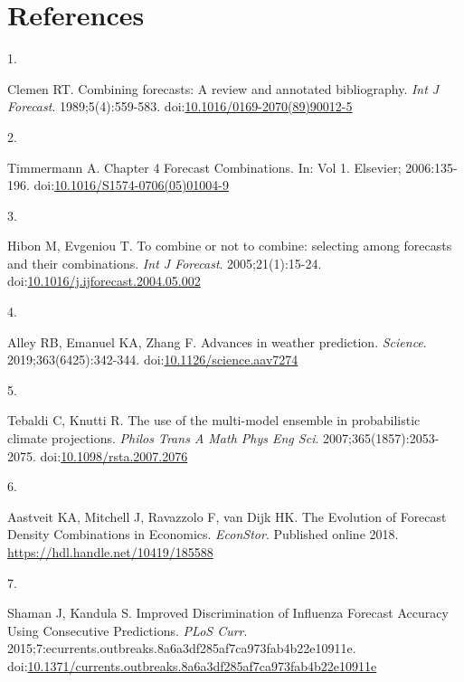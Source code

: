 \documentclass[
]{article}
\newlength{\cslhangindent}
\newlength{\csllabelwidth}
\newenvironment{CSLReferences}[2] %
 {\begin{list}{}{%
  \setlength{\itemindent}{0pt}
  \setlength{\leftmargin}{0pt}
  \setlength{\parsep}{0pt}
  \ifodd #1
   \setlength{\leftmargin}{\cslhangindent}
   \setlength{\itemindent}{-1\cslhangindent}
  \fi
  \setlength{\itemsep}{#2\baselineskip}}}
 {\end{list}}
\newcommand{\CSLLeftMargin}[1]{\parbox[t]{\csllabelwidth}{\strut#1\strut}}
\newcommand{\CSLRightInline}[1]{\parbox[t]{\linewidth - \csllabelwidth}{\strut#1\strut}}
\begin{document}
\section*{References}\label{references}

\label{refs}
\begin{CSLReferences}{0}{1}
\CSLLeftMargin{1. }%
\CSLRightInline{Clemen RT. Combining forecasts: A review and annotated
bibliography. \emph{Int J Forecast}. 1989;5(4):559-583.
doi:\href{https://doi.org/10.1016/0169-2070(89)90012-5}{10.1016/0169-2070(89)90012-5}}

\CSLLeftMargin{2. }%
\CSLRightInline{Timmermann A. Chapter 4 Forecast Combinations. In: Vol
1. Elsevier; 2006:135-196.
doi:\href{https://doi.org/10.1016/S1574-0706(05)01004-9}{10.1016/S1574-0706(05)01004-9}}

\CSLLeftMargin{3. }%
\CSLRightInline{Hibon M, Evgeniou T. To combine or not to combine:
selecting among forecasts and their combinations. \emph{Int J Forecast}.
2005;21(1):15-24.
doi:\href{https://doi.org/10.1016/j.ijforecast.2004.05.002}{10.1016/j.ijforecast.2004.05.002}}

\CSLLeftMargin{4. }%
\CSLRightInline{Alley RB, Emanuel KA, Zhang F. Advances in weather
prediction. \emph{Science}. 2019;363(6425):342-344.
doi:\href{https://doi.org/10.1126/science.aav7274}{10.1126/science.aav7274}}

\CSLLeftMargin{5. }%
\CSLRightInline{Tebaldi C, Knutti R. The use of the multi-model ensemble
in probabilistic climate projections. \emph{Philos Trans A Math Phys Eng
Sci}. 2007;365(1857):2053-2075.
doi:\href{https://doi.org/10.1098/rsta.2007.2076}{10.1098/rsta.2007.2076}}

\CSLLeftMargin{6. }%
\CSLRightInline{Aastveit KA, Mitchell J, Ravazzolo F, van Dijk HK. The
Evolution of Forecast Density Combinations in Economics.
\emph{EconStor}. Published online 2018.
\url{https://hdl.handle.net/10419/185588}}

\CSLLeftMargin{7. }%
\CSLRightInline{Shaman J, Kandula S. Improved {Discrimination} of
{Influenza} {Forecast} {Accuracy} {Using} {Consecutive} {Predictions}.
\emph{PLoS Curr}.
2015;7:ecurrents.outbreaks.8a6a3df285af7ca973fab4b22e10911e.
doi:\href{https://doi.org/10.1371/currents.outbreaks.8a6a3df285af7ca973fab4b22e10911e}{10.1371/currents.outbreaks.8a6a3df285af7ca973fab4b22e10911e}}


\end{CSLReferences}
\end{document}
